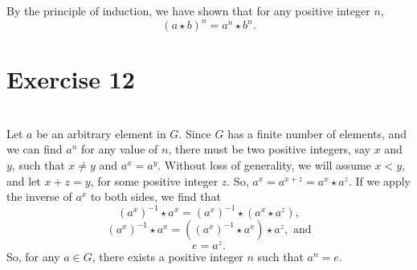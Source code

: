 \documentclass[12pt]{article}
\begin{document}
By the principle of induction, we have shown that for any positive integer $n$, 
\[(a \star b)^n = a^n \star b^n.\]


\section*{Exercise 12}
\\

Let $a$ be an arbitrary element in $G$. Since $G$ has a finite number of elements, and we can find $a^n$ for any value of $n$, there must be two positive integers, say $x$ and $y$, such that $x\ne y$ and $a^x = a^y$. Without loss of generality, we will assume $x<y$, and let $x+z=y$, for some positive integer $z$. So, $a^x = a^{x+z} = a^x \star a^z$. If we apply the inverse of $a^x$ to both sides, we find that
\[(a^x)^{-1} \star a^x = (a^x)^{-1} \star (a^x \star a^z),\]
\[(a^x)^{-1} \star a^x = ((a^x)^{-1} \star a^x) \star a^z, \text{ and}\]
\[e = a^z.\]
So, for any $a \in G$, there exists a positive integer $n$ such that $a^n = e$.
\end{document}
